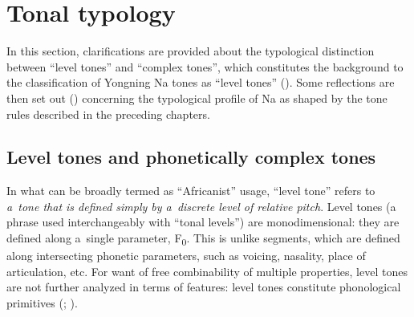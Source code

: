 \section{Tonal typology}
\label{sec:typologicalperspectives}

In this section, clarifications are provided about the typological distinction between “level tones” and “complex tones”, which constitutes the background to the classification of Yongning Na tones as “level tones” (). Some reflections are then set out () concerning the typological profile of Na  as shaped by the tone rules described in the preceding chapters. 

\subsection{Level tones and phonetically complex tones}
\label{sec:typologicalbackgroundtotheclassificationofyongningnatonesasleveltones}


In what can be broadly termed as “Africanist” usage, “level tone”
refers to \textit{a~tone that is
  defined simply by a~discrete level of relative pitch}. Level tones (a phrase used interchangeably with “tonal levels”) are monodimensional: they are defined along a~single parameter, F\textsubscript{0}. This is unlike segments, which are defined along intersecting phonetic parameters, such as voicing, nasality, place of articulation, etc. For want of free combinability of multiple properties, level tones are not further analyzed in terms of features: level tones constitute phonological primitives (\citealt[20]{clementsetal2011}; \citealt{hyman2011c}).

